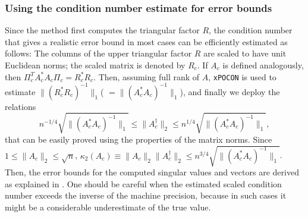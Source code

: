 \documentclass[12pt, a4paper, final]{article}
\numberwithin{equation}{section}
\begin{document}
\subsubsection{Using the condition number estimate for error bounds}\label{SSS=condest}
Since the method first computes the triangular factor $R$, the condition number that gives a realistic error bound in most cases can be efficiently estimated as follows: 
The columns of the upper triangular factor $R$ are scaled to have unit Euclidean norms; the scaled matrix is denoted by $R_c$. 
If $A_c$ is defined analogously, then $\Pi_c^T A_c^* A_c\Pi_c=R_c^* R_c$.
Then, assuming full rank of $A$, \texttt{xPOCON} is used to estimate $\|(R_c^* R_c)^{-1}\|_1$( $=\|(A_c^* A_c)^{-1}\|_1$), and
finally we deploy the relations	
$$
n^{-1/4} \sqrt{\|(A_c^* A_c)^{-1}\|_1} \leq \|A_c^{\dagger}\|_2 \leq n^{1/4} \sqrt{\|(A_c^* A_c)^{-1}\|_1},
$$
that can be easily proved using the properties of the matrix norms.
Since $1\leq \|A_c\|_2\leq \sqrt{n}$, $\kappa_2(A_c)\equiv \|A_c\|_2\|A_c^{\dagger}\|_2\leq n^{3/4}\sqrt{\|(A_c^* A_c)^{-1}\|_1}$.
Then, the error bounds for the computed singular values and vectors are
derived as explained in \cite{drm-xgesvd-paper}. One should be careful when the estimated scaled condition number exceeds the inverse of the machine precision, because in such cases it might be a considerable underestimate of the true value.
\end{document}
